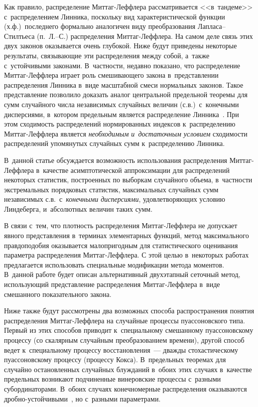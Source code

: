 \begin{multicols}{2}
Как правило, распределение Мит\-таг-Леф\-фле\-ра рассматривается 
<<в~тандеме>> с~распределением Линника, поскольку вид характеристической
функции (х.ф.)\ последнего формально аналогичен виду преобразования
Лап\-ла\-са--Стилть\-еса (п.~Л.--С.) распределения Мит\-таг-Леф\-фле\-ра. На
самом деле связь этих двух законов оказывается очень глубокой. Ниже
будут приведены некоторые результаты, связывающие эти распределения
между собой, а~также с~устойчивыми законами. В~частности, недавно
показано, что распределение Мит\-таг-Леф\-фле\-ра играет роль смешивающего
закона в~пред\-став\-ле\-нии распределения Линника в~виде масштабной смеси
нормальных законов. Такое пред\-став\-ле\-ние позволило доказать аналог
центральной предельной теоремы для сумм случайного числа независимых
случайных величин (с.в.)\
с~конечными дисперсиями, в~котором предельным
является распределение Линника~\cite{KorolevZeifman2017}. При этом
сходимость распределений нормированных индексов к~распределению
Мит\-таг-Леф\-фле\-ра является \textit{необходимым и~достаточным условием}
сходимости распределений упомянутых случайных сумм к~распределению
Лин\-ника. 
{

}

В~данной статье обсуждается возможность использования
распределения Мит\-таг-Леф\-фле\-ра в~качестве асимптотической
аппроксимации для распределений некоторых статистик, построенных по
выборкам случайного объема, в~частности экстремальных порядковых
статистик, максимальных случайных сумм независимых 
с.в.\ с~\textit{конечными дисперсиями}, удовлетворяющих условию
Линдеберга, и~абсолютных величин таких сумм.

В связи с~тем, что плотность распределения Мит\-таг-Леф\-фле\-ра не
допускает явного пред\-став\-ле\-ния в~терминах элементарных функций,
метод максимального правдоподобия оказывается малопригодным для
статистического оценивания параметра распределения Мит\-таг-Леф\-фле\-ра.
С этой целью в~некоторых работах предлагается использовать
специальные модификации метода моментов. В~данной работе будет
описан альтернативный двухэтапный сеточный метод, использующий
представление распределения Мит\-таг-Леф\-фле\-ра в~виде смешанного
показательного закона.

Ниже также будут рассмотрены два возможных способа распространения
понятия распределения Мит\-таг-Леф\-фле\-ра на случайные процессы
пуассоновского типа. Первый из этих способов приводит к~специальному
смешанному пуассоновскому процессу (со скалярным случайным
преобразованием времени), другой способ ведет к~специальному
процессу восстановления~--- дважды стохастическому пуассоновскому
процессу (процессу Кокса). В~предельных теоремах для случайно
остановленных случайных блужданий в~обоих этих случаях в~качестве
предельных возникают подчиненные винеровские процессы с~разными
субординаторами. В~обоих случаях конечномерные распределения
оказываются дроб\-но-устой\-чи\-вы\-ми~\cite{FSD2001}, но с~разными
па\-ра\-мет\-рами.


\end{multicols}
